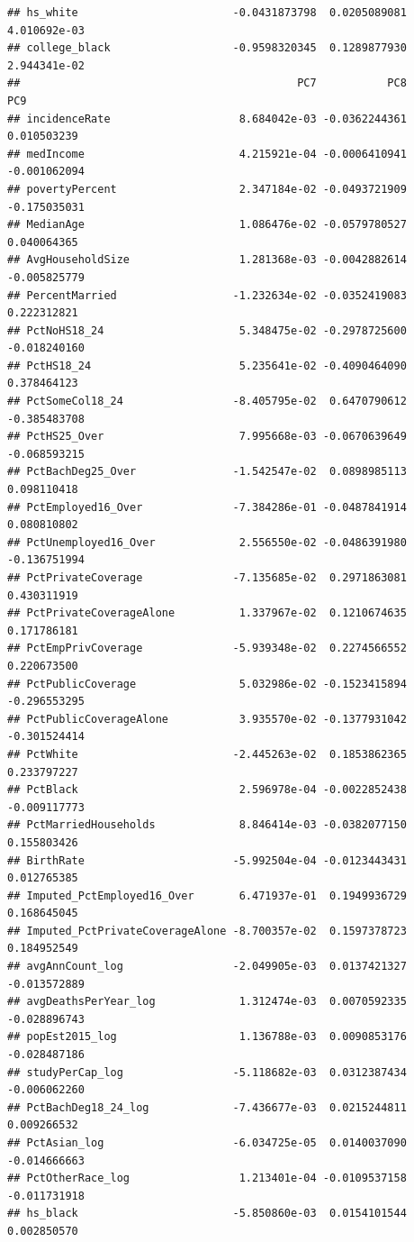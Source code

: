 \documentclass[
  11pt,
]{article}
\begin{document}
\begin{verbatim}
## hs_white                        -0.0431873798  0.0205089081  4.010692e-03
## college_black                   -0.9598320345  0.1289877930  2.944341e-02
##                                           PC7           PC8          PC9
## incidenceRate                    8.684042e-03 -0.0362244361  0.010503239
## medIncome                        4.215921e-04 -0.0006410941 -0.001062094
## povertyPercent                   2.347184e-02 -0.0493721909 -0.175035031
## MedianAge                        1.086476e-02 -0.0579780527  0.040064365
## AvgHouseholdSize                 1.281368e-03 -0.0042882614 -0.005825779
## PercentMarried                  -1.232634e-02 -0.0352419083  0.222312821
## PctNoHS18_24                     5.348475e-02 -0.2978725600 -0.018240160
## PctHS18_24                       5.235641e-02 -0.4090464090  0.378464123
## PctSomeCol18_24                 -8.405795e-02  0.6470790612 -0.385483708
## PctHS25_Over                     7.995668e-03 -0.0670639649 -0.068593215
## PctBachDeg25_Over               -1.542547e-02  0.0898985113  0.098110418
## PctEmployed16_Over              -7.384286e-01 -0.0487841914  0.080810802
## PctUnemployed16_Over             2.556550e-02 -0.0486391980 -0.136751994
## PctPrivateCoverage              -7.135685e-02  0.2971863081  0.430311919
## PctPrivateCoverageAlone          1.337967e-02  0.1210674635  0.171786181
## PctEmpPrivCoverage              -5.939348e-02  0.2274566552  0.220673500
## PctPublicCoverage                5.032986e-02 -0.1523415894 -0.296553295
## PctPublicCoverageAlone           3.935570e-02 -0.1377931042 -0.301524414
## PctWhite                        -2.445263e-02  0.1853862365  0.233797227
## PctBlack                         2.596978e-04 -0.0022852438 -0.009117773
## PctMarriedHouseholds             8.846414e-03 -0.0382077150  0.155803426
## BirthRate                       -5.992504e-04 -0.0123443431  0.012765385
## Imputed_PctEmployed16_Over       6.471937e-01  0.1949936729  0.168645045
## Imputed_PctPrivateCoverageAlone -8.700357e-02  0.1597378723  0.184952549
## avgAnnCount_log                 -2.049905e-03  0.0137421327 -0.013572889
## avgDeathsPerYear_log             1.312474e-03  0.0070592335 -0.028896743
## popEst2015_log                   1.136788e-03  0.0090853176 -0.028487186
## studyPerCap_log                 -5.118682e-03  0.0312387434 -0.006062260
## PctBachDeg18_24_log             -7.436677e-03  0.0215244811  0.009266532
## PctAsian_log                    -6.034725e-05  0.0140037090 -0.014666663
## PctOtherRace_log                 1.213401e-04 -0.0109537158 -0.011731918
## hs_black                        -5.850860e-03  0.0154101544  0.002850570

\end{verbatim}
\end{document}
